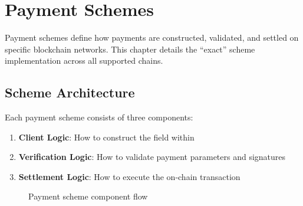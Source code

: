 \chapter{Payment Schemes}
\label{ch:payment-schemes}

Payment schemes define how payments are constructed, validated, and settled on specific blockchain networks. This chapter details the ``exact'' scheme implementation across all supported chains.

\section{Scheme Architecture}
\label{sec:scheme-architecture}

Each payment scheme consists of three components:

\begin{enumerate}
    \item \textbf{Client Logic}: How to construct the  field within 
    \item \textbf{Verification Logic}: How to validate payment parameters and signatures
    \item \textbf{Settlement Logic}: How to execute the on-chain transaction
\end{enumerate}

\begin{figure}[htbp]
\centering
{}
\caption{Payment scheme component flow}
\label{fig:scheme-flow}
\end{figure}

